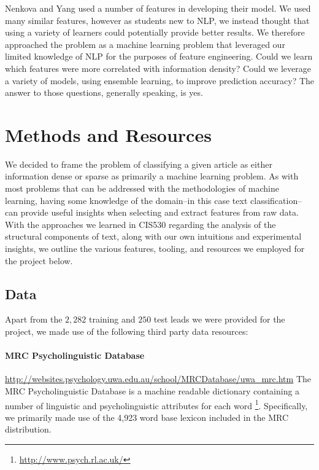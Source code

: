 \documentclass[
10pt, %
a4paper, %
oneside, %
headinclude,footinclude, %
BCOR5mm, %
]{scrartcl}
\begin{document}
Nenkova and Yang used a number of features in developing their model. We used
many similar features, however as students new to NLP, we instead thought that
using a variety of learners could potentially provide better results. We
therefore approached the problem as a machine learning problem that leveraged
our limited knowledge of NLP for the purposes of feature engineering. Could we
learn which features were more correlated with information density? Could we
leverage a variety of models, using ensemble learning, to improve prediction
accuracy? The answer to those questions, generally speaking, is yes.


\section{Methods and Resources}

We decided to frame the problem of classifying a given article as either 
information dense or sparse as primarily a machine learning problem. As with
most problems that can be addressed with the methodologies of machine learning,
having some knowledge of the domain--in this case text classification--can 
provide useful insights when selecting and extract features from raw data. With 
the approaches we learned in CIS530 regarding the analysis of the structural
components of text, along with our own intuitions and experimental 
insights, we outline the various features, tooling, and resources we employed 
for the project below.

\subsection{Data}

Apart from the $2,282$ training and $250$ test leads we were provided for the 
project, we made use of the following third party data resources:

\paragraph{\textbf{MRC Psycholinguistic Database}}
\hfill \newline \noindent \url{http://websites.psychology.uwa.edu.au/school/MRCDatabase/uwa_mrc.htm}
\hfill \newline \noindent The MRC Psycholinguistic Database is a machine readable
dictionary containing a number of linguistic and psycholinguistic
attributes for each word \footnote{\url{http://www.psych.rl.ac.uk/}}. 
Specifically, we primarily made use of the 4,923 word base lexicon included in 
the MRC distribution.
\end{document}
